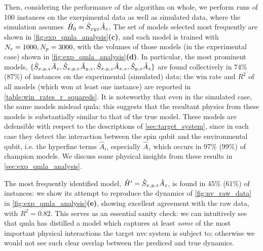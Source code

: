 Then, considering the performance of the algorithm on whole, 
    we perform \glspl{run} of 100 \glspl{instance} on the exerpimental data as well as simulated data,
    where the simulation assumes\footnotemark \ $\hat{H}_0 = \hat{S}_{xyz} \hat{A}_z$, 
    The set of models selected most frequently are shown in \cref{fig:exp_qmla_analysis}\textbf{(c)},
    and each model is trained with $N_e=1000, N_p=3000$,
    with the \glspl{volume} of those models (in the experimental case) shown in  \cref{fig:exp_qmla_analysis}\textbf{(d)}.
In particular, the most prominent models, $\{ \hat{S}_{x,y,z}\hat{A}_{z}, \hat{S}_{x,y,z}\hat{A}_{y,z}, \hat{S}_{x,y,z}\hat{A}_{x,z}, \hat{S}_{y,z}\hat{A}_{z} \}$ are found collectively in 74\% (87\%)
    of \glspl{instance} on the experimental (simulated) data;
    the  \gls{win rate} and $R^2$ of all models (which won at least one instance) are reported in \cref{table:win_rates_r_squareds}. 
It is noteworthy that even in the simulated case, the same models mislead \gls{qmla}:
    this suggests that the resultant physics from these models is substantially similar to that of the  \gls{true model}\footnotemark. 
These models are defensible with respect to the descriptions of \cref{sec:target_system}, 
    since in each case they detect the interaction between the spin qubit and the environmental qubit, 
    i.e. the hyperfine terms $\hat{A}_i$, especially $\hat{A}_z$ which occurs in 97\% (99\%) of \glspl{champion model}. 
We discuss some physical insights from these results in \cref{sec:exp_qmla_analysis}.   
\par 

The most frequently identified model, $\hat{H}^{\prime} = \hat{S}_{x,y,z}\hat{A}_{z}$, is found in $45\%$ ($61\%$) of instances:
    we show its attempt to reproduce the dynamics of \cref{fig:nv_raw_data} in \cref{fig:exp_qmla_analysis}\textbf{(e)}, 
    showing excellent agreement with the raw data, with $R^2=0.82$. 
This serves as an essential sanity check: 
    we can intuitively see that \gls{qmla} has distilled a model which captures at least \emph{some} 
    of the most important physical interactions the target \gls{nvc} system is subject to; 
    otherwise we would not see such clear overlap between the prediced and true dynamics. 
\par 

